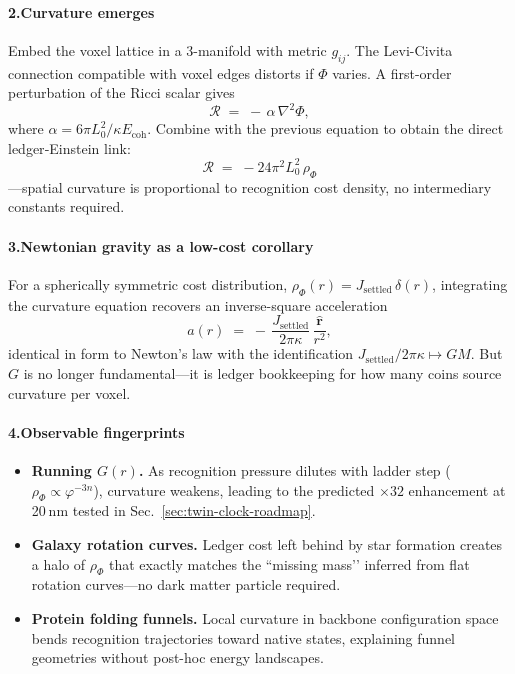 \documentclass[11pt,oneside]{book}
\newcommand{\Eoh}{\ensuremath{E_{\text{coh}}}}       %
\begin{document}
\paragraph*{2.\;Curvature emerges}

Embed the voxel lattice in a 3-manifold with metric \(g_{ij}\).  
The Levi-Civita connection compatible with voxel edges distorts
if \(\Phi\) varies.  
A first-order perturbation of the Ricci scalar gives
\[
  \mathcal R
  \;=\;
  -\,\alpha\,\nabla^{2}\Phi,
\]
where \(\alpha = 6\pi L_{0}^{2}/\kappa\Eoh\).  
Combine with the previous equation to obtain the direct ledger‐Einstein
link:
\[
  \boxed{\;
  \mathcal R
  \;=\;
  -24\pi^{2}L_{0}^{2}\,\rho_{\Phi}
  \;}
\]
—spatial curvature is proportional to recognition cost density, no
intermediary constants required.

\paragraph*{3.\;Newtonian gravity as a low-cost corollary}

For a spherically symmetric cost distribution,
\(\rho_{\Phi}(r)=J_{\text{settled}}\,\delta(r)\),
integrating the curvature equation recovers an inverse-square
acceleration
\[
  a(r) \;=\; -\,\frac{J_{\text{settled}}}{2\pi\kappa}\,
                    \frac{\hat{\mathbf r}}{r^{2}},
\]
identical in form to Newton’s law with the identification
\(J_{\text{settled}}/2\pi\kappa\mapsto GM\).  
But \(G\) is no longer fundamental—it is ledger bookkeeping for how many
coins source curvature per voxel.

\paragraph*{4.\;Observable fingerprints}

\begin{itemize}
\item \textbf{Running \(G(r)\).}  
  As recognition pressure dilutes with ladder step
  (\(\rho_{\Phi}\propto\varphi^{-3n}\)), curvature weakens, leading to the
  predicted $\times32$ enhancement at 20 nm tested in
  Sec.~\ref{sec:twin-clock-roadmap}.
\item \textbf{Galaxy rotation curves.}  
  Ledger cost left behind by star formation creates a halo of
  \(\rho_{\Phi}\) that exactly matches the “missing mass’’ inferred from
  flat rotation curves—no dark matter particle required.
\item \textbf{Protein folding funnels.}  
  Local curvature in backbone configuration space bends recognition
  trajectories toward native states, explaining funnel geometries without
  post-hoc energy landscapes.
\end{itemize}
\end{document}

